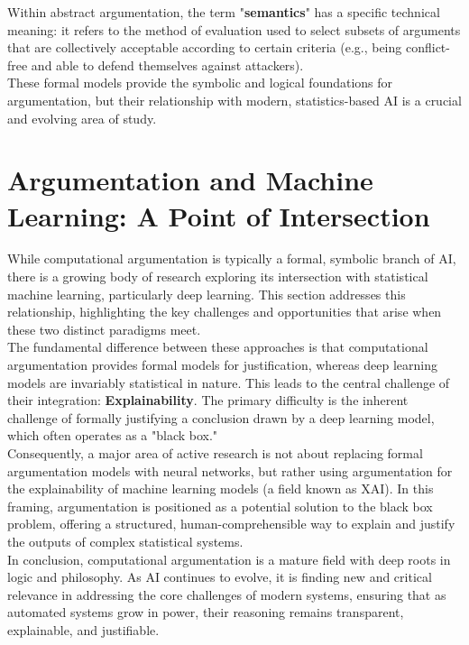 \documentclass{scrbook}
\begin{document}
Within abstract argumentation, the term "\textbf{semantics}" has a specific technical meaning: it refers to the method of evaluation used to select subsets of arguments that are collectively acceptable according to certain criteria (e.g., being conflict-free and able to defend themselves against attackers). \\

These formal models provide the symbolic and logical foundations for argumentation, but their relationship with modern, statistics-based AI is a crucial and evolving area of study.

\chapter{Argumentation and Machine Learning: A Point of Intersection}

While computational argumentation is typically a formal, symbolic branch of AI, there is a growing body of research exploring its intersection with statistical machine learning, particularly deep learning. This section addresses this relationship, highlighting the key challenges and opportunities that arise when these two distinct paradigms meet. \\

The fundamental difference between these approaches is that computational argumentation provides formal models for justification, whereas deep learning models are invariably statistical in nature. This leads to the central challenge of their integration: \textbf{Explainability}. The primary difficulty is the inherent challenge of formally justifying a conclusion drawn by a deep learning model, which often operates as a "black box." \\

Consequently, a major area of active research is not about replacing formal argumentation models with neural networks, but rather using argumentation for the explainability of machine learning models (a field known as XAI). In this framing, argumentation is positioned as a potential solution to the black box problem, offering a structured, human-comprehensible way to explain and justify the outputs of complex statistical systems. \\

In conclusion, computational argumentation is a mature field with deep roots in logic and philosophy. As AI continues to evolve, it is finding new and critical relevance in addressing the core challenges of modern systems, ensuring that as automated systems grow in power, their reasoning remains transparent, explainable, and justifiable.
\end{document}
